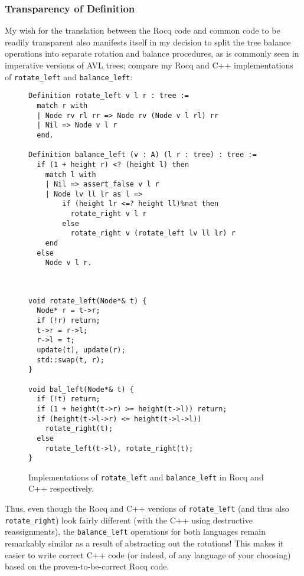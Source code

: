\documentclass[acmsmall, authorversion, nonacm, overload]{acmart}
\begin{document}
\subsubsection{Transparency of Definition}
My wish for the translation between the Rocq code and common code to be readily transparent
also manifests itself in my decision to split the tree balance operations into separate
rotation and balance procedures, as is commonly seen in imperative versions of AVL trees;
compare my Rocq and C++ implementations of \texttt{rotate_left} and \texttt{balance_left}:
\begin{figure}[h!]
  \begin{minipage}{0.5\linewidth}
    \centering
    \begin{verbatim}
Definition rotate_left v l r : tree :=
  match r with
  | Node rv rl rr => Node rv (Node v l rl) rr
  | Nil => Node v l r
  end.

Definition balance_left (v : A) (l r : tree) : tree :=
  if (1 + height r) <? (height l) then
    match l with
    | Nil => assert_false v l r
    | Node lv ll lr as l =>
        if (height lr <=? height ll)%nat then
          rotate_right v l r
        else
          rotate_right v (rotate_left lv ll lr) r
    end
  else
    Node v l r.

    \end{verbatim}
  \end{minipage}
  ~\qquad\qquad~
  \begin{minipage}{0.5\linewidth}
    \centering
    \begin{verbatim}
void rotate_left(Node*& t) {
  Node* r = t->r;
  if (!r) return;
  t->r = r->l;
  r->l = t;
  update(t), update(r);
  std::swap(t, r);
}

void bal_left(Node*& t) {
  if (!t) return;
  if (1 + height(t->r) >= height(t->l)) return;
  if (height(t->l->r) <= height(t->l->l))
    rotate_right(t);
  else
    rotate_left(t->l), rotate_right(t);
}
    \end{verbatim}
  \end{minipage}
  \caption{Implementations of \texttt{rotate_left} and \texttt{balance_left} in Rocq and C++ respectively.}
\end{figure}

Thus, even though the Rocq and C++ versions of \texttt{rotate_left} (and thus also \texttt{rotate_right})
look fairly different (with the C++ using destructive reassignments),
the \texttt{balance_left} operations for both languages remain remarkably similar
as a result of abstracting out the rotations!
This makes it easier to write correct C++ code (or indeed, of any language of your choosing)
based on the proven-to-be-correct Rocq code.
\end{document}
